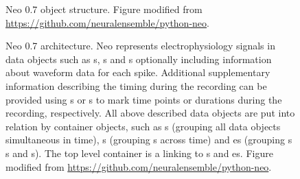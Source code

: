 \begin{figure}
    \centering
    \def\svgwidth{\textwidth}
    
%     
%     
    \label{fig:neo_uml}
    \caption{Neo 0.7 object structure. Figure modified from \url{https://github.com/neuralensemble/python-neo}.}
\end{figure}


\begin{figure}
    \centering
    \def\svgwidth{\textwidth}
%     
%     
    \label{fig:neo_architecture}
    \caption{Neo 0.7 architecture. Neo represents electrophysiology signals in data objects such as s, s and s optionally including information about waveform data for each spike. Additional supplementary information describing the timing during the recording can be provided using s or s to mark time points or durations during the recording, respectively. All above described data objects are put into relation by container objects, such as s (grouping all data objects simultaneous in time), s (grouping s across time) and es (grouping s s and s). The top level container is a  linking to s and es. Figure modified from \url{https://github.com/neuralensemble/python-neo}.}
\end{figure}


% 
% 
% 
